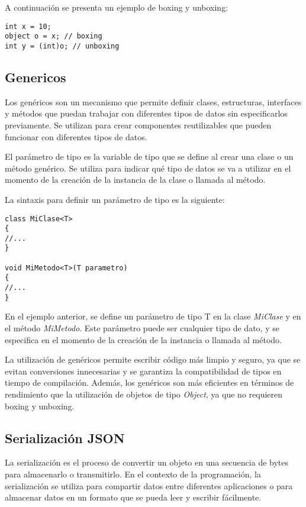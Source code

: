 \documentclass[executivepaper]{article}
\begin{document}
A continuación se presenta un ejemplo de boxing y unboxing:

\begin{lstlisting}
int x = 10;
object o = x; // boxing
int y = (int)o; // unboxing
\end{lstlisting}

\subsection*{Genericos}

Los genéricos son un mecanismo que permite definir clases, estructuras, interfaces y métodos que puedan trabajar con diferentes tipos de datos sin especificarlos previamente. Se utilizan para crear componentes reutilizables que pueden funcionar con diferentes tipos de datos.

El parámetro de tipo es la variable de tipo que se define al crear una clase o un método genérico. Se utiliza para indicar qué tipo de datos se va a utilizar en el momento de la creación de la instancia de la clase o llamada al método.

La sintaxis para definir un parámetro de tipo es la siguiente:

\begin{lstlisting}
class MiClase<T>
{
//...
}

void MiMetodo<T>(T parametro)
{
//...
}
\end{lstlisting}

En el ejemplo anterior, se define un parámetro de tipo T en la clase \emph{MiClase} y en el método \emph{MiMetodo}. Este parámetro puede ser cualquier tipo de dato, y se especifica en el momento de la creación de la instancia o llamada al método.

La utilización de genéricos permite escribir código más limpio y seguro, ya que se evitan conversiones innecesarias y se garantiza la compatibilidad de tipos en tiempo de compilación. Además, los genéricos son más eficientes en términos de rendimiento que la utilización de objetos de tipo \emph{Object}, ya que no requieren boxing y unboxing.

\subsection{Serialización JSON}


La serialización es el proceso de convertir un objeto en una secuencia de bytes para almacenarlo o transmitirlo. En el contexto de la programación, la serialización se utiliza para compartir datos entre diferentes aplicaciones o para almacenar datos en un formato que se pueda leer y escribir fácilmente.
\end{document}
